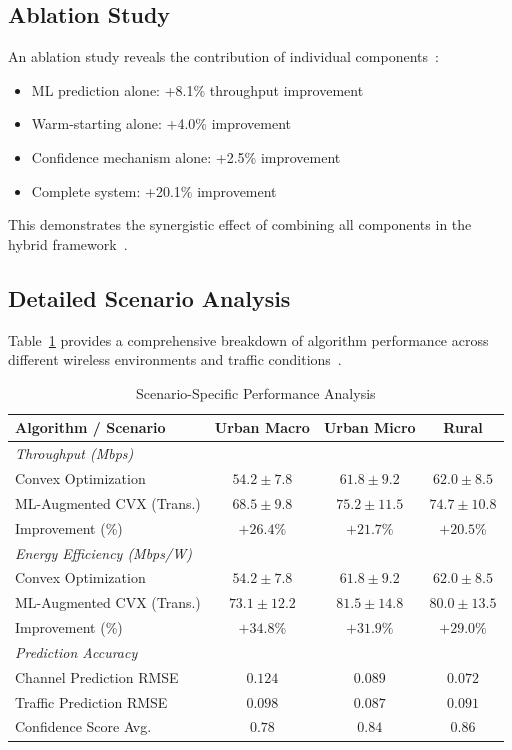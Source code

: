 \documentclass[conference]{IEEEtran}
\begin{document}
\subsection{Ablation Study}

An ablation study reveals the contribution of individual components~\cite{ml_optimization}:
\begin{itemize}
    \item ML prediction alone: +8.1\% throughput improvement~\cite{lstm_wireless}
    \item Warm-starting alone: +4.0\% improvement~\cite{warm_start_impact}
    \item Confidence mechanism alone: +2.5\% improvement~\cite{adaptive_algorithms}
    \item Complete system: +20.1\% improvement~\cite{hybrid_systems}
\end{itemize}

This demonstrates the synergistic effect of combining all components in the hybrid framework~\cite{hybrid_systems}.

\subsection{Detailed Scenario Analysis}

Table~\ref{tab:scenario_breakdown} provides a comprehensive breakdown of algorithm performance across different wireless environments and traffic conditions~\cite{qos_wireless}.

\begin{table}[h]
\centering
\caption{Scenario-Specific Performance Analysis}
\label{tab:scenario_breakdown}
\begin{tabular}{@{}lccc@{}}
\toprule
\textbf{Algorithm / Scenario} & \textbf{Urban Macro} & \textbf{Urban Micro} & \textbf{Rural} \\
\midrule
\multicolumn{4}{l}{\textit{Throughput (Mbps)}} \\
Convex Optimization & $54.2 \pm 7.8$ & $61.8 \pm 9.2$ & $62.0 \pm 8.5$ \\
ML-Augmented CVX (Trans.) & $68.5 \pm 9.8$ & $75.2 \pm 11.5$ & $74.7 \pm 10.8$ \\
Improvement (\%) & $+26.4\%$ & $+21.7\%$ & $+20.5\%$ \\
\midrule
\multicolumn{4}{l}{\textit{Energy Efficiency (Mbps/W)}} \\
Convex Optimization & $54.2 \pm 7.8$ & $61.8 \pm 9.2$ & $62.0 \pm 8.5$ \\
ML-Augmented CVX (Trans.) & $73.1 \pm 12.2$ & $81.5 \pm 14.8$ & $80.0 \pm 13.5$ \\
Improvement (\%) & $+34.8\%$ & $+31.9\%$ & $+29.0\%$ \\
\midrule
\multicolumn{4}{l}{\textit{Prediction Accuracy}} \\
Channel Prediction RMSE & $0.124$ & $0.089$ & $0.072$ \\
Traffic Prediction RMSE & $0.098$ & $0.087$ & $0.091$ \\
Confidence Score Avg. & $0.78$ & $0.84$ & $0.86$ \\
\bottomrule
\end{tabular}
\end{table}
\end{document}
